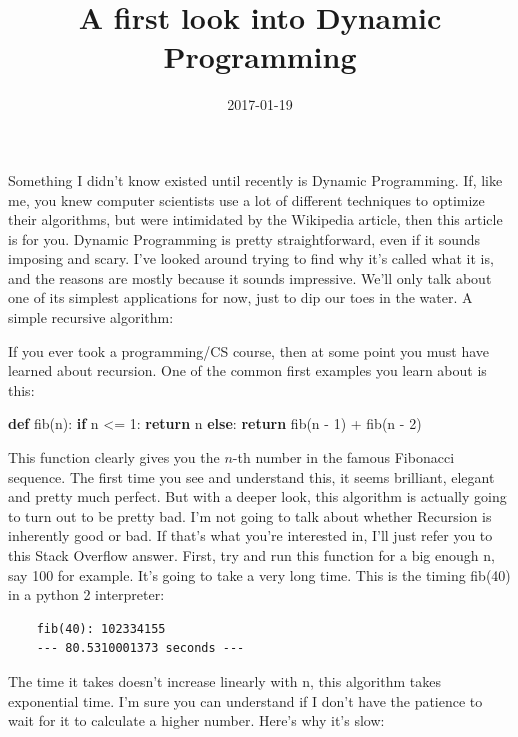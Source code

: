 \documentclass[
  letterpaper,
  DIV=11,
  numbers=noendperiod]{scrartcl}
\title{A first look into Dynamic Programming}
\author{}
\date{2017-01-19}
\newenvironment{Shaded}{\begin{snugshade}}{\end{snugshade}}
\newcommand{\ControlFlowTok}[1]{\textcolor[rgb]{0.00,0.23,0.31}{\textbf{#1}}}
\newcommand{\DecValTok}[1]{\textcolor[rgb]{0.68,0.00,0.00}{#1}}
\newcommand{\KeywordTok}[1]{\textcolor[rgb]{0.00,0.23,0.31}{\textbf{#1}}}
\newcommand{\NormalTok}[1]{\textcolor[rgb]{0.00,0.23,0.31}{#1}}
\newcommand{\OperatorTok}[1]{\textcolor[rgb]{0.37,0.37,0.37}{#1}}
\begin{document}
\maketitle


Something I didn't know existed until recently is Dynamic Programming.
If, like me, you knew computer scientists use a lot of different
techniques to optimize their algorithms, but were intimidated by the
Wikipedia article, then this article is for you. Dynamic Programming is
pretty straightforward, even if it sounds imposing and scary. I've
looked around trying to find why it's called what it is, and the reasons
are mostly because it sounds impressive. We'll only talk about one of
its simplest applications for now, just to dip our toes in the water. A
simple recursive algorithm:

If you ever took a programming/CS course, then at some point you must
have learned about recursion. One of the common first examples you learn
about is this:

\begin{Shaded}
\begin{Highlighting}[]
    \KeywordTok{def}\NormalTok{ fib(n):}
        \ControlFlowTok{if}\NormalTok{ n }\OperatorTok{\textless{}=} \DecValTok{1}\NormalTok{:}
            \ControlFlowTok{return}\NormalTok{ n}
        \ControlFlowTok{else}\NormalTok{:}
            \ControlFlowTok{return}\NormalTok{ fib(n }\OperatorTok{{-}} \DecValTok{1}\NormalTok{) }\OperatorTok{+}\NormalTok{ fib(n }\OperatorTok{{-}} \DecValTok{2}\NormalTok{)}
\end{Highlighting}
\end{Shaded}

This function clearly gives you the \(n\)-th number in the famous
Fibonacci sequence. The first time you see and understand this, it seems
brilliant, elegant and pretty much perfect. But with a deeper look, this
algorithm is actually going to turn out to be pretty bad. I'm not going
to talk about whether Recursion is inherently good or bad. If that's
what you're interested in, I'll just refer you to this Stack Overflow
answer. First, try and run this function for a big enough n, say 100 for
example. It's going to take a very long time. This is the timing fib(40)
in a python 2 interpreter:

\begin{verbatim}
    fib(40): 102334155
    --- 80.5310001373 seconds ---
\end{verbatim}

The time it takes doesn't increase linearly with n, this algorithm takes
exponential time. I'm sure you can understand if I don't have the
patience to wait for it to calculate a higher number. Here's why it's
slow:
\end{document}

